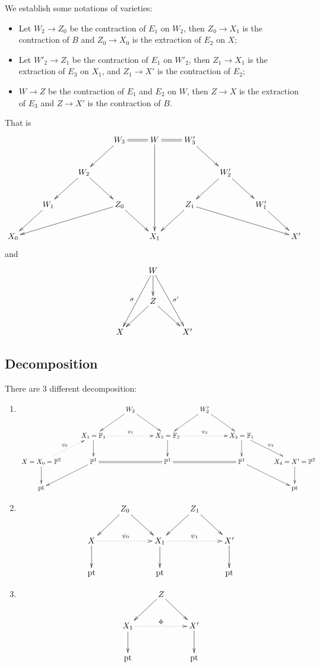 \documentclass{article}
\begin{document}
We establish some notations of varieties:
\begin{itemize}
	\item Let $W_{2}\to Z_{0}$ be the contraction of $E_{1}$ on $W_{2}$, then $Z_{0} \to X_{1}$ is the contraction of $B$  and $Z_{0}\to X_{0}$ is the extraction of $E_{2}$ on $X$;
	\item Let $W'_{2}\to Z_{1}$ be the contraction of $E_{1}$ on $W'_{2}$, then $Z_{1} \to X_{1}$ is the extraction of $E_{3}$ on $X_{1}$, and $Z_{1}\to X'$ is the contraction of $E_{2}$;
	\item $W\to Z$ be the contraction of $E_{1}$ and $E_{2}$ on $W$, then $Z\to X$ is the extraction of $E_{3}$ and $Z\to X'$ is the contraction of $B$.
\end{itemize}
That is
\[ \xymatrix{&&&W_3\ar[ld]\ar@{=}[r]&W\ar[ddd]\ar@{=}[r]&W_3'\ar[rd]\\
		&&W_2\ar[ld]\ar[rd]&&&&W_2'\ar[rd]\ar[dl]\\
		&W_1\ar[ld]&&Z_0\ar[llld]\ar[rd]&&Z_1\ar[ld]\ar[rrrd]&&W_1'\ar[rd]\\
		X_0&&&&X_1&&&&X'
	} \]
and
\[\xymatrix{
		&W\ar[d]\ar[ddl]_{\sigma}\ar[ddr]^{\sigma'}&\\
		&Z\ar[dl]\ar[dr]\\
		X&&X' }  \]

\subsection{Decomposition}
There are 3 different decomposition:
\begin{enumerate}
	\item
	      \[ \xymatrix{
		      &&W_2\ar[ld]\ar[rd]&&W_2'\ar[ld]\ar[rd]\\
		      &X_1=\mathbb{F}_1\ar@{.>}[rr]^{\psi_{1}}\ar[d]&&X_2=\mathbb{F}_2\ar@{.>}[rr]^{\psi_{2}}\ar[d]&&X_3=\mathbb{F}_1\ar[d]\ar[rd]^{\psi_{3}}\\
		      X=X_0=\mathbb{P}^2\ar[d]\ar@{.>}[ru]^{\psi_{0}}&\mathbb{P}^1\ar[ld]\ar@{=}[rr]&&\mathbb{P}^1\ar@{=}[rr]&&\mathbb{P}^1\ar[rd]&X_4=X'=\mathbb{P}^2\ar[d]\\
		      \text{pt}&&&&&&\text{pt} } \]
	\item

	      \[
		      \xymatrix{
		      &Z_{0}\ar[rd]\ar[ld] & &Z_{1}\ar[rd]\ar[ld]\\
		      X\ar[d]\ar@{.>}[rr]^{\psi_{0}}& &X_{1}\ar@{.>}[rr]^{\psi_{1}}\ar[d]&&X'\ar[d]\\
		      \text{pt}&&\text{pt}&&\text{pt}
		      }
	      \]
	\item
	      \[
		      \xymatrix{
			      &Z\ar[rd]\ar[ld] & \\
			      X_{1}\ar@{.>}[rr]^{\Phi}\ar[d]& &X'\ar[d]\\
			      \text{pt}&&\text{pt}
		      }
	      \]
\end{enumerate}
\end{document}
